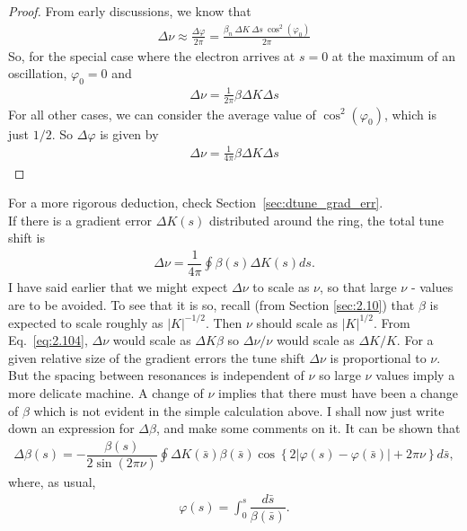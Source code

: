 \begin{proof}
	From early discussions, we know that
	\begin{align*}
		\Delta \nu \approx \frac{\Delta \varphi}{2\pi} = \frac{\beta_n\ \Delta K\ \Delta s\ \cos^2(\varphi_0)}{2\pi}
	\end{align*}
    So, for the special case where the electron arrives at $s=0$ at the maximum of an oscillation, $\varphi_0=0$ and
    \begin{align*}
		\Delta \nu = \frac{1}{2\pi}\beta \Delta K \Delta s
	\end{align*}
    For all other cases, we can consider the average value of $\cos^2(\varphi_0)$, which is just $1/2$. So $\Delta \varphi$ is given by
	\begin{align*}
		\Delta \nu = \frac{1}{4\pi}\beta \Delta K \Delta s
	\end{align*}
\end{proof}
For a more rigorous deduction, check Section~\ref{sec:dtune_grad_err}.\\
If there is a gradient error $\Delta K(s)$ distributed around the ring, the total tune shift is
\begin{align}\label{eq:2.104}
	\Delta\nu = \dfrac{1}{4\pi}\oint \beta(s) \Delta K(s) ds.
\end{align}
I have said earlier that we might expect $\Delta\nu$ to scale as $\nu$, so that large $\nu$ -
values are to be avoided. To see that it is so, recall (from Section \ref{sec:2.10}) that $\beta$ is expected to scale roughly as $|K|^{-1/2}$. Then $\nu$ should scale as $|K|^{1/2}$. From Eq.~\eqref{eq:2.104}, $\Delta\nu$ would scale as $\Delta K\beta$ so $\Delta\nu/\nu$ would scale as $\Delta K/K$. For a given relative size of the gradient errors the tune shift $\Delta\nu$ is proportional to $\nu$. But the spacing between resonances is independent of $\nu$ so large $\nu$ values imply a more delicate machine.
A change of $\nu$ implies that there must have been a change of $\beta$ which is not evident in the simple calculation above. I shall now just write down an expression for $\Delta\beta$, and make some comments on it. It can be shown that
\begin{align}\label{eq:2.105}
	\boxed{\Delta\beta(s) = -\dfrac{\beta(s)}{2\sin{(2\pi\nu)}}\oint \Delta K(\bar{s})\beta(\bar{s})\cos{\left\lbrace 2 |\varphi(s) - \varphi(\bar{s})| + 2\pi\nu \right\rbrace} d\bar{s}},
\end{align}
where, as usual,
\begin{align*}
	\varphi(s) = \int_0^s\dfrac{d\bar{s}}{\beta(\bar{s})}.
\end{align*}
